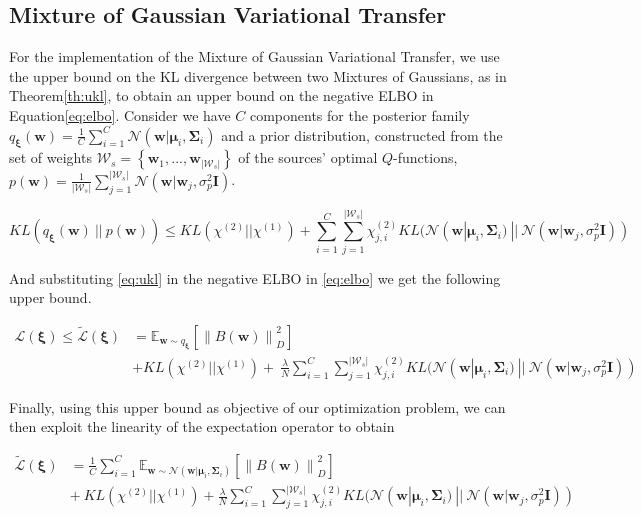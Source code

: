 \documentclass{article}
\newcommand{\norm}[1]{\left\lVert #1 \right\rVert}
\newcommand{\abs}[1]{\left\lvert #1 \right\rvert}
\begin{document}
\subsection{Mixture of Gaussian Variational Transfer}

For the implementation of the Mixture of Gaussian Variational Transfer, we use the upper bound on the KL divergence between two Mixtures of Gaussians, as in Theorem\ref{th:ukl}, to obtain an upper bound on the negative ELBO in Equation\ref{eq:elbo}. Consider we have $C$ components for the posterior family $q_{\bm{\xi}}(\bm{w}) = \frac{1}{C}\sum_{i=1}^C\mathcal{N}(\bm{w}|\bm{\mu}_i,\bm{\Sigma}_i)$ and a prior distribution, constructed from the set of weights $\mathcal{W}_s = \left\lbrace \bm{w}_1,..., \bm{w}_{|\mathcal{W}_s|} \right\rbrace$ of the sources' optimal $Q$-functions, $p(\bm{w}) = \frac{1}{\abs{\mathcal{W}_s}}\sum_{j=1}^{|\mathcal{W}_s|}\mathcal{N}(\bm{w}|\bm{w}_j,\sigma_p^2\bm{I})$.

\begin{equation}\label{eq:ukl}
KL\left(q_{\bm{\xi}}(\bm{w})\ ||\ p(\bm{w})\right) \leq KL(\chi^{(2)}||\chi^{(1)}) + \sum_{i=1}^C\sum_{j=1}^{|\mathcal{W}_s|} \chi_{j,i}^{(2)}KL(\mathcal{N}(\bm{w}|\bm{\mu}_i, \bm{\Sigma}_i)\ ||\ \mathcal{N}(\bm{w}|\bm{w}_j, \sigma_p^2\bm{I}))
\end{equation}

And substituting \ref{eq:ukl} in the negative ELBO in \ref{eq:elbo} we get the following upper bound.

\begin{align}
\mathcal{L}(\bm{\xi}) \leq  \widetilde{\mathcal{L}}(\bm{\xi}) &= \mathbb{E}_{\bm{w} \sim q_{\bm{\xi}}}\left[\norm{B(\bm{w})}_D^2\right] \nonumber \\&+ KL(\chi^{(2)}||\chi^{(1)}) +\  \frac{\lambda}{N}\sum_{i=1}^C\sum_{j=1}^{|\mathcal{W}_s|} \chi_{j,i}^{(2)}KL(\mathcal{N}(\bm{w}|\bm{\mu}_i, \bm{\Sigma}_i)\ ||\ \mathcal{N}(\bm{w}|\bm{w}_j, \sigma_p^2\bm{I}))
\end{align}

Finally, using this upper bound as objective of our optimization problem, we can then exploit the linearity of the expectation operator to obtain


\begin{align}
\widetilde{\mathcal{L}}(\bm{\xi}) &= \frac{1}{C}\sum_{i=1}^C \mathbb{E}_{\bm{w} \sim \mathcal{N}(\bm{w}|\bm{\mu}_i, \bm{\Sigma}_i)}\left[\norm{B(\bm{w})}_D^2\right] \nonumber \\ &+\ KL(\chi^{(2)}||\chi^{(1)}) + \frac{\lambda}{N}\sum_{i=1}^C\sum_{j=1}^{|\mathcal{W}_s|} \chi_{j,i}^{(2)} KL(\mathcal{N}(\bm{w}|\bm{\mu}_i, \bm{\Sigma}_i)\ ||\ \mathcal{N}(\bm{w}|\bm{w}_j, \sigma_p^2\bm{I}))
\end{align}
\end{document}
